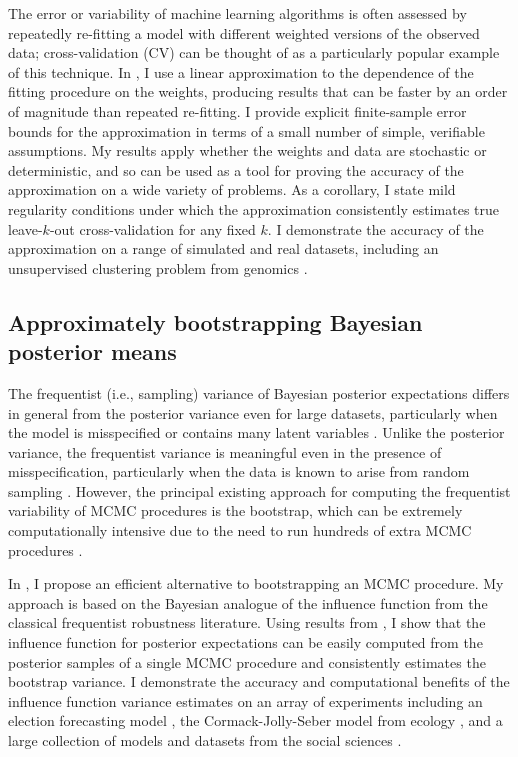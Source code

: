 The error or variability of machine learning algorithms is often assessed by
repeatedly re-fitting a model with different weighted versions of the observed
data; cross-validation (CV) can be thought of as a particularly popular example
of this technique.
%
In \citet{giordano:2019:ij}, I use a linear approximation to the dependence of
the fitting procedure on the weights, producing results that can be faster by an
order of magnitude than repeated re-fitting. I provide explicit finite-sample
error bounds for the approximation in terms of a small number of simple,
verifiable assumptions.  My results apply whether the weights and data are
stochastic or deterministic, and so can be used as a tool for proving the
accuracy of the approximation on a wide variety of problems. As a
corollary, I state mild regularity conditions under which the approximation
consistently estimates true leave-$k$-out cross-validation for any fixed $k$. I
demonstrate the accuracy of the approximation on a range of simulated and real
datasets, including an unsupervised clustering problem from genomics
\citep{Luan:2003:clustering, shoemaker:2015:ultrasensitive}.


\subsection*{Approximately bootstrapping Bayesian posterior means}

The frequentist (i.e., sampling) variance of Bayesian posterior expectations
differs in general from the posterior variance even for large datasets,
particularly when the model is misspecified or contains many latent variables
\citep{kleijn:2006:misspecification}. Unlike the posterior variance, the
frequentist variance is meaningful even in the presence of misspecification,
particularly when the data is known to arise from random sampling
\citep{waddell:2002:bayesphyloboot}.  However, the principal existing approach
for computing the frequentist variability of MCMC procedures is the bootstrap,
which can be extremely computationally intensive due to the need to run hundreds
of extra MCMC procedures \citep{huggins:2019:bayesbag}.

In \citet{giordano:2020:stanconbayesij, giordano:2021:bayesij}, I propose an
efficient alternative to bootstrapping an MCMC procedure.  My approach is based
on the Bayesian analogue of the influence function from the classical
frequentist robustness literature.  Using results from
\citet{giordano:2018:covariances, giordano:2019:ij}, I show that the influence
function for posterior expectations can be easily computed from the posterior
samples of a single MCMC procedure and consistently estimates the bootstrap
variance. I demonstrate the accuracy and computational benefits of the influence
function variance estimates on an array of experiments including an election
forecasting model \citep{economist:2020:election}, the Cormack-Jolly-Seber model
from ecology \citep{kery:2011:bayesian}, and a large collection of models and
datasets from the social sciences \citep{gelman:2006:arm}.

